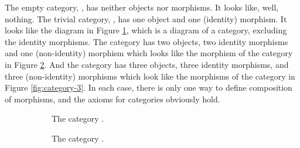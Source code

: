 \begin{example}
  \label{ex:category-trivial}


  The empty category, , has neither objects nor morphisms. It
  looks like, well, nothing. The trivial category, , has one
  object and one (identity) morphism. It looks like the diagram in
  Figure \ref{fig:category-1}, which is a diagram of a category,
  excluding the identity morphisms. The category  has two
  objects, two identity morphisms and one (non-identity) morphism
  which looks like the morphism of the category in Figure
  \ref{fig:category-2}. And the category  has three objects,
  three identity morphisms, and three (non-identity) morphisms which
  look like the morphisms of the category in Figure
  \ref{fig:category-3}. In each case, there is only one way to define
  composition of morphisms, and the axioms for categories obviously
  hold.

  \begin{figure}[htb]
    \begin{center}
      \begin{subfigure}[t]{.3\linewidth}
        \begin{center}
        \end{center}
        \caption{The category .}
        \label{fig:category-1}
      \end{subfigure}
      \begin{subfigure}[t]{.3\linewidth}
        \begin{center}
        \end{center}
        \caption{The category .}
        \label{fig:category-2}
      \end{subfigure}
      \begin{subfigure}[t]{.3\linewidth}
        \begin{center}
\end{center}
\end{subfigure}
\end{center}
\end{figure}
\end{example}

